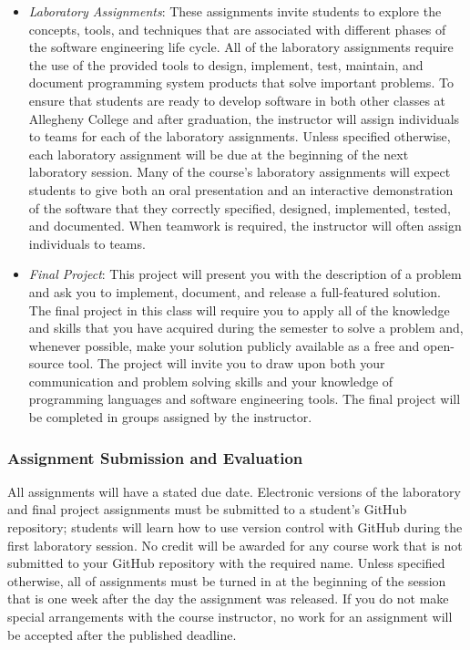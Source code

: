\documentclass[11pt]{article}
\begin{document}
\begin{itemize}
  \item {\em Laboratory Assignments\/}: These assignments invite students to explore the concepts, tools, and techniques
    that are associated with different phases of the software engineering life cycle. All of the laboratory assignments
    require the use of the provided tools to design, implement, test, maintain, and document programming system products
    that solve important problems. To ensure that students are ready to develop software in both other classes at
    Allegheny College and after graduation, the instructor will assign individuals to teams for each of the laboratory
    assignments. Unless specified otherwise, each laboratory assignment will be due at the beginning of the next
    laboratory session. Many of the course's laboratory assignments will expect students to give both an oral
    presentation and an interactive demonstration of the software that they correctly specified, designed, implemented,
    tested, and documented. When teamwork is required, the instructor will often assign individuals to teams.

  \item {\em Final Project\/}: This project will present you with the description of a problem and ask you to implement,
    document, and release a full-featured solution. The final project in this class will require you to apply all of the
    knowledge and skills that you have acquired during the semester to solve a problem and, whenever possible, make your
    solution publicly available as a free and open-source tool. The project will invite you to draw upon both your
    communication and problem solving skills and your knowledge of programming languages and software engineering tools.
    The final project will be completed in groups assigned by the instructor.

\end{itemize}

\subsubsection*{Assignment Submission and Evaluation}

All assignments will have a stated due date. Electronic versions of the laboratory and final project assignments must be
submitted to a student's GitHub repository; students will learn how to use version control with GitHub during the first
laboratory session. No credit will be awarded for any course work that is not submitted to your GitHub repository with
the required name. Unless specified otherwise, all of assignments must be turned in at the beginning of the session that
is one week after the day the assignment was released. If you do not make special arrangements with the course
instructor, no work for an assignment will be accepted after the published deadline.
\end{document}
